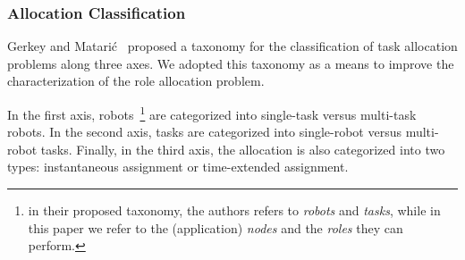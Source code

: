 



%
%	
%	
%	
%	  


\subsubsection{\textbf{Allocation Classification}} Gerkey and Matarić~\cite{Gerkey:2004} proposed a taxonomy for the classification of task allocation problems along three axes. We adopted this taxonomy as a means to improve the characterization of the role allocation problem.

In the first axis, robots~\footnote{in their proposed taxonomy, the authors refers to \textit{robots} and \textit{tasks}, while in this paper we refer to the (application) \textit{nodes} and the \textit{roles} they can perform.} 
are categorized into single-task versus multi-task robots. In the second axis, tasks are categorized into single-robot versus multi-robot tasks. Finally, in the third axis, the allocation is also categorized into two types: instantaneous assignment or time-extended assignment.

